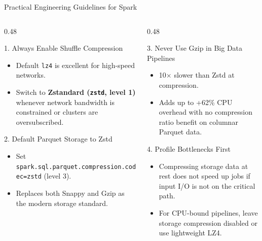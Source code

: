 \documentclass[aspectratio=169, 10pt]{beamer}
\begin{document}
\begin{frame}{Practical Engineering Guidelines for Spark}
  \begin{columns}[T]
    \begin{column}{0.48\textwidth}
      \begin{exampleblock}{1. Always Enable Shuffle Compression}
        \begin{itemize}
          \scriptsize
          \item Default \texttt{lz4} is excellent for high-speed networks.
          \item Switch to \textbf{Zstandard (\texttt{zstd}, level 1)} whenever network bandwidth is constrained or clusters are oversubscribed.
        \end{itemize}
      \end{exampleblock}

      \begin{exampleblock}{2. Default Parquet Storage to Zstd}
        \begin{itemize}
          \scriptsize
          \item Set \texttt{spark.sql.parquet.compression.codec=zstd} (level 3).
          \item Replaces both Snappy and Gzip as the modern storage standard.
        \end{itemize}
      \end{exampleblock}
    \end{column}

    \begin{column}{0.48\textwidth}
      \begin{alertblock}{3. Never Use Gzip in Big Data Pipelines}
        \begin{itemize}
          \scriptsize
          \item 10$\times$ slower than Zstd at compression.
          \item Adds up to +62\% CPU overhead with no compression ratio benefit on columnar Parquet data.
        \end{itemize}
      \end{alertblock}

      \begin{block}{4. Profile Bottlenecks First}
        \begin{itemize}
          \scriptsize
          \item Compressing storage data at rest does not speed up jobs if input I/O is not on the critical path.
          \item For CPU-bound pipelines, leave storage compression disabled or use lightweight LZ4.
        \end{itemize}
      \end{block}
    \end{column}
  \end{columns}
\end{frame}
\end{document}
